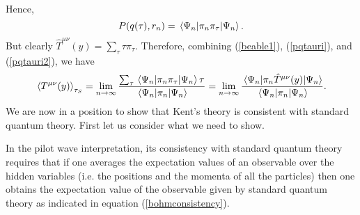   Hence,
\begin{equation}\label{pqtauri2}
P(q(\tau), r_n)=\ev*{\pi_n\pi_\tau}{\Psi_n}.
\end{equation}
But clearly $\hat{T}^{\mu\nu}(y)=\sum_\tau \tau \pi_\tau.$ Therefore, combining (\ref{beable1}), (\ref{pqtauri}), and (\ref{pqtauri2}), we have 
\begin{equation}\label{kentconsistency0}
\ev*{T^{\mu\nu}(y)}_{\tau_S}=\lim_{n\rightarrow\infty}\frac{\sum_\tau \ev*{\pi_n\pi_\tau}{\Psi_n}\tau}{\ev*{\pi_n}{\Psi_n}}=\lim_{n\rightarrow\infty}\frac{\ev*{\pi_n\hat{T}^{\mu\nu}(y)}{\Psi_n}}{\ev*{\pi_n}{\Psi_n}}.
\end{equation}
We are now in a position to show that Kent's theory is consistent with standard quantum theory. First let us consider what we need to show. 

In the pilot wave interpretation, its consistency with standard quantum theory requires that if one averages the expectation values of an observable over the hidden variables (i.e. the positions and the momenta of all the particles) then one obtains the expectation value of the observable given by standard quantum theory as indicated in equation (\ref{bohmconsistency}). 

